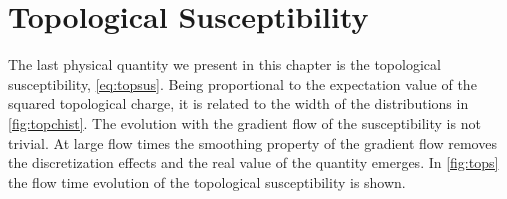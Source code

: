 \section{Topological Susceptibility}
The last physical quantity we present in this chapter is the topological susceptibility, \cref{eq:topsus}. Being proportional to the expectation value of the squared topological charge, it is related to the width of the distributions in \cref{fig:topchist}. The evolution with the gradient flow of the susceptibility is not trivial. At large flow times the smoothing property of the gradient flow removes the discretization effects and the real value of the quantity emerges. In \cref{fig:tops} the flow time evolution of the topological susceptibility is shown.
 
